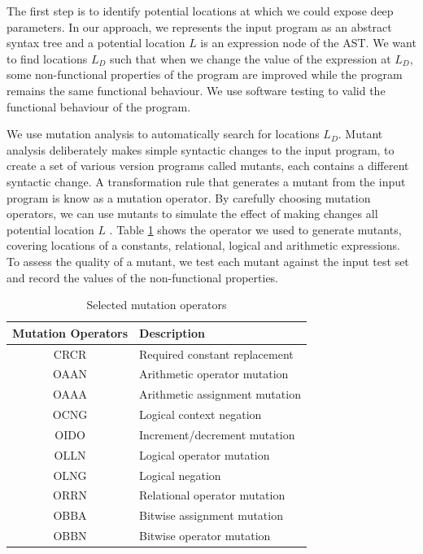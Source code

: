 The first step is to identify potential locations at which we could expose deep parameters. 
In our approach, we represents the input program as an abstract syntax tree and a potential location $L$ is an expression node of the AST. 
We want to find locations $L_D$ such that when we change the value of the expression at $L_D$, some non-functional properties of the program are improved while the program remains the same functional behaviour. 
We use software testing to valid the functional behaviour of the program. 

We use mutation analysis to automatically search for locations $L_D$. Mutant analysis deliberately makes simple syntactic changes to the input program, to create a set of various version programs called mutants, each contains a different syntactic change. A transformation rule that generates a mutant from the input program is know as a mutation operator. By carefully choosing mutation operators, we can use mutants to simulate the effect of making changes all potential location $L$ . Table \ref{tab:cmop} shows the operator we used to generate mutants, covering locations of a constants, relational, logical and arithmetic expressions. 
To assess the quality of a mutant, we test each mutant against the input test set and record the values of the non-functional properties. 

\begin{table} [htbp]
\caption{Selected mutation operators}
\label{tab:cmop} 
\begin{center}
\begin{tabular}{ | c | l |}
  \hline
  Mutation Operators & Description \\ 
\hline
  CRCR & Required constant replacement \\
  OAAN & Arithmetic operator mutation \\
  OAAA & Arithmetic assignment mutation \\
  OCNG & Logical context negation \\
  OIDO & Increment/decrement mutation  \\
  OLLN & Logical operator mutation  \\ 
  OLNG & Logical negation \\
  ORRN & Relational operator mutation \\
  OBBA & Bitwise assignment mutation \\
  OBBN & Bitwise operator mutation \\
\hline
\end{tabular} 
\end{center} 
\end{table} 

